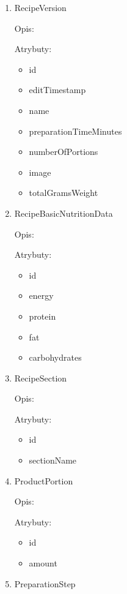 \begin{enumerate}[label={\textbf{KAT/\protect\threedigits{\theenumi}}}, wide, labelwidth=!, labelindent=0pt]
    \item \label{kat:RecipeVersion} RecipeVersion

    Opis: \lipsum[1]
    \par
    Atrybuty:
    \begin{itemize}
        \item id
        \item editTimestamp
        \item name
        \item preparationTimeMinutes
        \item numberOfPortions
        \item image
        \item totalGramsWeight
    \end{itemize}

    \item \label{kat:RecipeBasicNutritionData} RecipeBasicNutritionData

    Opis: \lipsum[1]
    \par
    Atrybuty:
    \begin{itemize}
        \item id
        \item energy
        \item protein
        \item fat
        \item carbohydrates
    \end{itemize}

    \item \label{kat:RecipeSection} RecipeSection

    Opis: \lipsum[1]
    \par
    Atrybuty:
    \begin{itemize}
        \item id
        \item sectionName
    \end{itemize}

    \item \label{kat:ProductPortion} ProductPortion

    Opis: \lipsum[1]
    \par
    Atrybuty:
    \begin{itemize}
        \item id
        \item amount
    \end{itemize}

    \item \label{kat:PreparationStep} PreparationStep


\end{enumerate}
